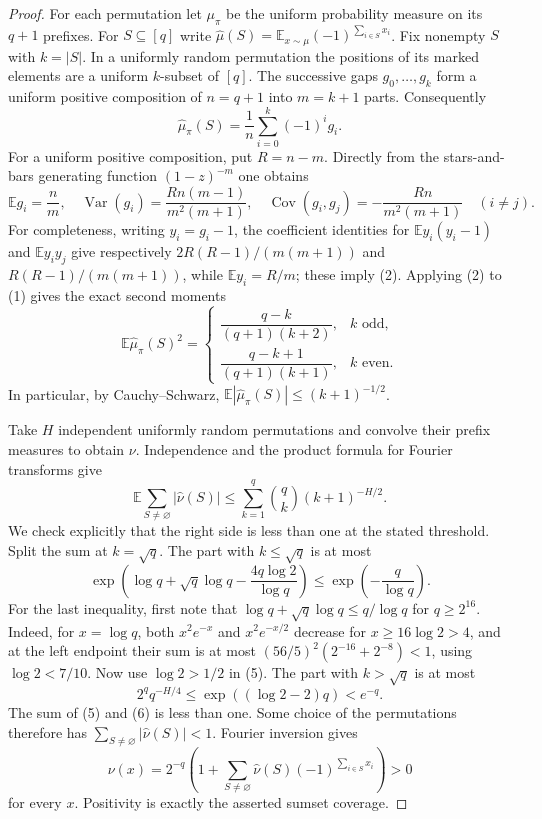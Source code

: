 \documentclass[11pt]{article}
\begin{document}
\begin{proof}
For each permutation let $\mu_\pi$ be the uniform probability measure
on its $q+1$ prefixes. For $S\subseteq[q]$ write
$\widehat\mu(S)=\mathbb E_{x\sim\mu}(-1)^{\sum_{i\in S}x_i}$.
Fix nonempty $S$ with $k=|S|$. In a uniformly random permutation the
positions of its marked elements are a uniform $k$-subset of $[q]$.
The successive gaps $g_0,\ldots,g_k$ form a uniform positive composition
of $n=q+1$ into $m=k+1$ parts. Consequently
\[
 \widehat\mu_\pi(S)=\frac1n\sum_{i=0}^k(-1)^i g_i. \tag{1}
\]
For a uniform positive composition, put $R=n-m$. Directly from the
stars-and-bars generating function $(1-z)^{-m}$ one obtains
\[
 \mathbb E g_i=\frac nm,\quad
 \operatorname{Var}(g_i)=\frac{Rn(m-1)}{m^2(m+1)},\quad
 \operatorname{Cov}(g_i,g_j)=-\frac{Rn}{m^2(m+1)}\quad(i\ne j).
 \tag{2}
\]
For completeness, writing $y_i=g_i-1$, the coefficient identities
for $\mathbb E y_i(y_i-1)$ and $\mathbb E y_i y_j$ give respectively
$2R(R-1)/(m(m+1))$ and $R(R-1)/(m(m+1))$, while
$\mathbb E y_i=R/m$; these imply (2).
Applying (2) to (1) gives the exact second moments
\[
 \mathbb E\widehat\mu_\pi(S)^2=
 \begin{cases}
 \dfrac{q-k}{(q+1)(k+2)},&k\text{ odd},\\[4pt]
 \dfrac{q-k+1}{(q+1)(k+1)},&k\text{ even}.
 \end{cases}
 \tag{3}
\]
In particular, by Cauchy--Schwarz,
$\mathbb E|\widehat\mu_\pi(S)|\leq(k+1)^{-1/2}$.

Take $H$ independent uniformly random permutations and convolve their
prefix measures to obtain $\nu$. Independence and the product formula
for Fourier transforms give
\[
 \mathbb E\sum_{S\ne\varnothing}|\widehat\nu(S)|
 \leq\sum_{k=1}^q\binom qk(k+1)^{-H/2}. \tag{4}
\]
We check explicitly that the right side is less than one at the stated
threshold. Split the sum at $k=\sqrt q$. The part with $k\leq\sqrt q$
is at most
\[
 \exp\left(\log q+\sqrt q\log q-
       \frac{4q\log2}{\log q}\right)
 \leq \exp\left(-\frac q{\log q}\right). \tag{5}
\]
For the last inequality, first note that
$\log q+\sqrt q\log q\leq q/\log q$ for $q\geq2^{16}$.
Indeed, for $x=\log q$, both $x^2e^{-x}$ and $x^2e^{-x/2}$ decrease
for $x\geq16\log2>4$, and at the left endpoint their sum is at most
$(56/5)^2(2^{-16}+2^{-8})<1$, using $\log2<7/10$.
Now use $\log2>1/2$ in (5). The part with $k>\sqrt q$ is at most
\[
 2^q q^{-H/4}\leq\exp((\log2-2)q)<e^{-q}. \tag{6}
\]
The sum of (5) and (6) is less than one. Some choice of the
permutations therefore has $\sum_{S\ne\varnothing}|\widehat\nu(S)|<1$.
Fourier inversion gives
\[
 \nu(x)=2^{-q}\left(1+
   \sum_{S\ne\varnothing}\widehat\nu(S)(-1)^{\sum_{i\in S}x_i}\right)>0
\]
for every $x$. Positivity is exactly the asserted sumset coverage.
\end{proof}
\end{document}
